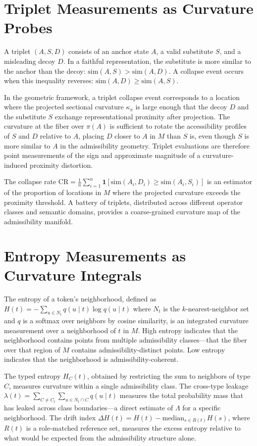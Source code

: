 \documentclass[12pt, oneside]{book}
\theoremstyle{plain-flyxion}
\theoremstyle{definition-flyxion}
\newcommand{\kpi}{\kappa_{\pi}}
\newcommand{\Lam}{\Lambda}
\begin{document}
\section{Triplet Measurements as Curvature Probes}

A triplet $(A, S, D)$ consists of an anchor state $A$, a valid substitute $S$, and a
misleading decoy $D$. In a faithful representation, the substitute is more similar to the
anchor than the decoy: $\mathrm{sim}(A,S) > \mathrm{sim}(A,D)$. A collapse event occurs
when this inequality reverses: $\mathrm{sim}(A,D) \geq \mathrm{sim}(A,S)$.

In the geometric framework, a triplet collapse event corresponds to a location where the
projected sectional curvature $\kpi$ is large enough that the decoy $D$ and the substitute
$S$ exchange representational proximity after projection. The curvature at the fiber over
$\pi(A)$ is sufficient to rotate the accessibility profiles of $S$ and $D$ relative to
$A$, placing $D$ closer to $A$ in $M$ than $S$ is, even though $S$ is more similar to $A$
in the admissibility geometry. Triplet evaluations are therefore point measurements of
the sign and approximate magnitude of a curvature-induced proximity distortion.

The collapse rate $\mathrm{CR} = \frac{1}{n}\sum_{i=1}^n \mathbf{1}[\mathrm{sim}(A_i,D_i)
\geq \mathrm{sim}(A_i,S_i)]$ is an estimator of the proportion of locations in $M$ where
the projected curvature exceeds the proximity threshold. A battery of triplets, distributed
across different operator classes and semantic domains, provides a coarse-grained
curvature map of the admissibility manifold.

\section{Entropy Measurements as Curvature Integrals}

The entropy of a token's neighborhood, defined as $H(t) = -\sum_{u\in N_t} q(u\mid t)
\log q(u\mid t)$ where $N_t$ is the $k$-nearest-neighbor set and $q$ is a softmax over
neighbors by cosine similarity, is an integrated curvature measurement over a
neighborhood of $t$ in $M$. High entropy indicates that the neighborhood contains points
from multiple admissibility classes---that the fiber over that region of $M$ contains
admissibility-distinct points. Low entropy indicates that the neighborhood is
admissibility-coherent.

The typed entropy $H_C(t)$, obtained by restricting the sum to neighbors of type $C$,
measures curvature within a single admissibility class. The cross-type leakage $\lambda(t)
= \sum_{C\neq C_t}\sum_{u\in N_t\cap C} q(u\mid t)$ measures the total probability mass
that has leaked across class boundaries---a direct estimate of $\Lam$ for a specific
neighborhood. The drift index $\Delta H(t) = H(t) - \mathrm{median}_{s\in R(t)} H(s)$,
where $R(t)$ is a role-matched reference set, measures the excess entropy relative to
what would be expected from the admissibility structure alone.
\end{document}
